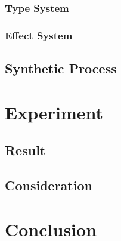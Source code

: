 \documentclass[12pt, a4paper, titlepage]{report}
\begin{document}
    \subsection{Type System}
    \subsection{Effect System}
  \section{Synthetic Process}

\chapter{Experiment}\label{section:experiment}
\section{Result}
\section{Consideration}

\chapter{Conclusion}\label{section:conclusion}



\end{document}
